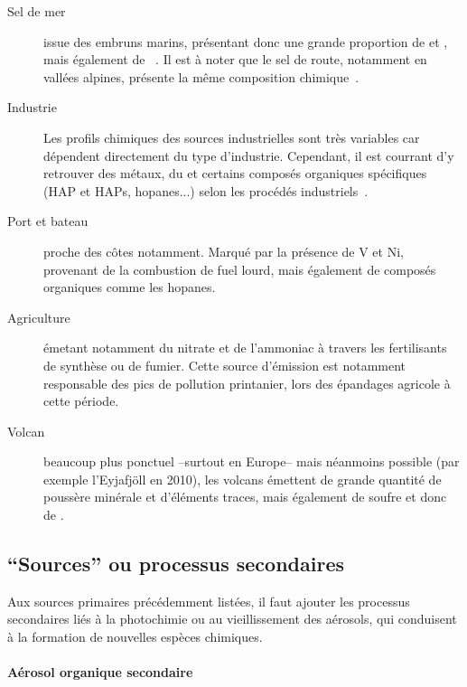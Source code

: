 \begin{description}
    \item[Sel de mer] issue des embruns marins, présentant donc une grande proportion de
         et , mais également de
        ~\autocite{belisCritical2013,odowdMarine1997,pioClimatology2007}. Il
        est à noter que le sel de route, notamment en vallées alpines, présente la même
        composition chimique~\autocite{airrhone-alpesInfluence2012}.

    \item[Industrie] Les profils chimiques des sources industrielles sont très variables
        car dépendent directement du type d'industrie. Cependant, il est courrant d'y
        retrouver des métaux, du \SOq et certains composés organiques spécifiques (HAP et
        HAPs, hopanes...) selon les procédés
        industriels~\autocite{elhaddadPrimary2011,sylvestreComprehensive2017}.

    \item[Port et bateau] proche des côtes notamment. Marqué par la présence de V et Ni,
        provenant de la combustion de fuel lourd, mais également de composés organiques
        comme les hopanes.

    \item[Agriculture] émetant notamment du nitrate et de l'ammoniac à travers les
        fertilisants de synthèse ou de fumier. Cette source d'émission est notamment
        responsable des pics de pollution printanier, lors des épandages agricole à cette
        période.

    \item[Volcan] beaucoup plus ponctuel --surtout en Europe-- mais néanmoins possible
        (par exemple l'Eyjafjöll en 2010), les volcans émettent de grande quantité de
        poussère minérale et d'éléments traces, mais également de soufre et donc de \SOq.

\end{description}

\subsection{``Sources'' ou processus secondaires}%
\label{sub:_sources_secondaires}

Aux sources primaires précédemment listées, il faut ajouter les processus secondaires liés
à la photochimie ou au vieillissement des aérosols, qui conduisent à la formation de
nouvelles espèces chimiques.

\paragraph{Aérosol organique secondaire}%
\label{par:aérosol_organique_secondaire}

